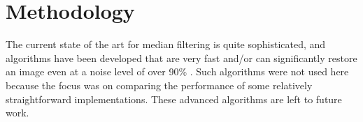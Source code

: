 %




\section{Methodology}

The current state of the art for median filtering is quite sophisticated, and algorithms have been developed that are very fast \cite{Sanchez2012,Perrot2014} and/or can significantly restore an image even at a noise level of over 90\% \cite{Gao2015,Wu2011}.  Such algorithms were not used here because the focus was on comparing the performance of some relatively straightforward implementations.  These advanced algorithms are left to future work.


